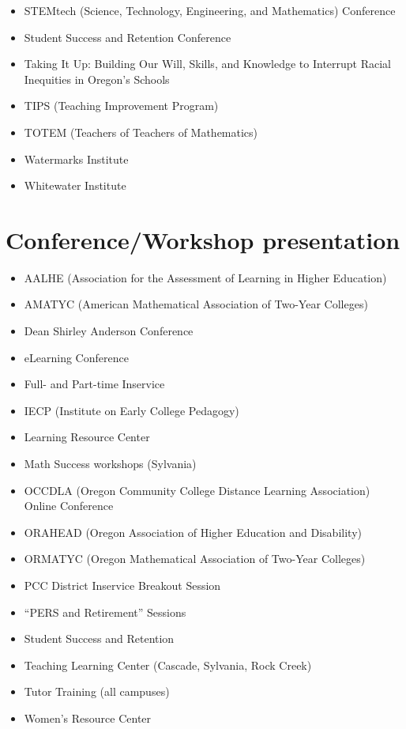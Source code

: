 \begin{widepage}
\begin{multicols*}{2}
\begin{itemize}[label={}]
\item STEMtech (Science, Technology, Engineering, and Mathematics) Conference
\item Student Success and Retention Conference
\item Taking It Up:  Building Our Will, Skills, and Knowledge to Interrupt Racial Inequities in Oregon's Schools
\item TIPS (Teaching Improvement Program)
\item TOTEM (Teachers of Teachers of Mathematics)
\item Watermarks Institute
\item Whitewater Institute
\end{itemize}

\section*{Conference/Workshop presentation}

\begin{itemize}[label={}]
\item AALHE (Association for the Assessment of Learning in Higher Education)
\item AMATYC (American Mathematical Association of Two-Year Colleges)
\item Dean Shirley Anderson Conference
\item eLearning Conference
\item Full- and Part-time Inservice
\item IECP (Institute on Early College Pedagogy)
\item Learning Resource Center
\item Math Success workshops (Sylvania)
\item OCCDLA (Oregon Community College Distance Learning Association) Online Conference
\item ORAHEAD (Oregon Association of Higher Education and Disability)
\item ORMATYC (Oregon Mathematical Association of Two-Year Colleges)
\item PCC District Inservice Breakout Session
\item ``PERS and Retirement'' Sessions
\item Student Success and Retention
\item Teaching Learning Center (Cascade, Sylvania, Rock Creek)
\item Tutor Training (all campuses)
\item Women's Resource Center
\end{itemize}


\end{multicols*}
\end{widepage}

